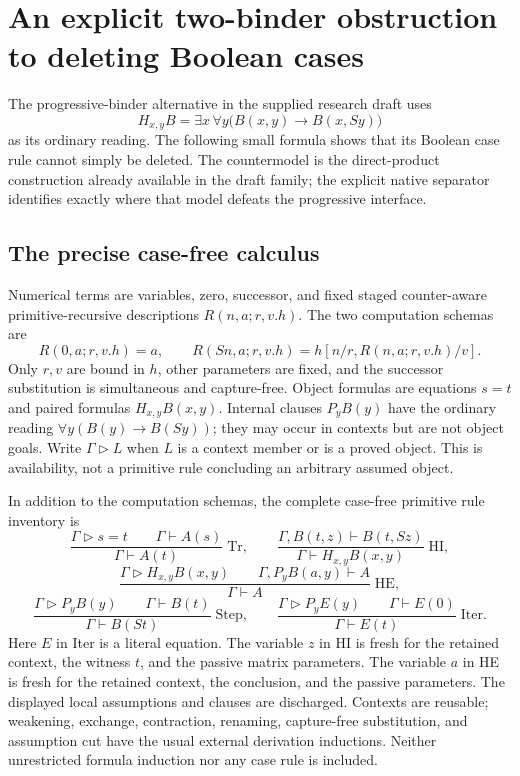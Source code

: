 \section{An explicit two-binder obstruction to deleting Boolean cases}
\label{sec:two-binder-obstruction}

The progressive-binder alternative in the supplied research draft uses
\[
 H_{x,y}B=\exists x\,\forall y\bigl(B(x,y)\to B(x,Sy)\bigr)
\]
as its ordinary reading. The following small formula shows that its
Boolean case rule cannot simply be deleted. The countermodel is the
direct-product construction already available in the draft family;
the explicit native separator identifies exactly where that model defeats
the progressive interface.

\subsection{The precise case-free calculus}

Numerical terms are variables, zero, successor, and fixed staged
counter-aware primitive-recursive descriptions
$R(n,a;r,v.h)$. The two computation schemas are
\[
 R(0,a;r,v.h)=a,\qquad
 R(Sn,a;r,v.h)=h[n/r,R(n,a;r,v.h)/v].
\]
Only $r,v$ are bound in $h$, other parameters are fixed, and the
successor substitution is simultaneous and capture-free. Object formulas
are equations $s=t$ and paired formulas $H_{x,y}B(x,y)$. Internal
clauses $P_yB(y)$ have the ordinary reading
$\forall y(B(y)\to B(Sy))$; they may occur in contexts but are not
object goals. Write $\Gamma\mathrel{\triangleright}L$ when $L$ is a
context member or is a proved object. This is availability, not a
primitive rule concluding an arbitrary assumed object.

In addition to the computation schemas, the complete case-free primitive
rule inventory is
\[
 \frac{\Gamma\mathrel{\triangleright}s=t\qquad
       \Gamma\vdash A(s)}{\Gamma\vdash A(t)}\;\mathrm{Tr},
 \qquad
 \frac{\Gamma,B(t,z)\vdash B(t,Sz)}
      {\Gamma\vdash H_{x,y}B(x,y)}\;\mathrm{HI},
\]
\[
 \frac{\Gamma\mathrel{\triangleright}H_{x,y}B(x,y)\qquad
       \Gamma,P_yB(a,y)\vdash A}{\Gamma\vdash A}\;\mathrm{HE},
\]
\[
 \frac{\Gamma\mathrel{\triangleright}P_yB(y)\qquad
       \Gamma\vdash B(t)}{\Gamma\vdash B(St)}\;\mathrm{Step},
 \qquad
 \frac{\Gamma\mathrel{\triangleright}P_yE(y)\qquad
       \Gamma\vdash E(0)}{\Gamma\vdash E(t)}\;\mathrm{Iter}.
\]
Here $E$ in Iter is a literal equation. The variable $z$ in HI is
fresh for the retained context, the witness $t$, and the passive matrix
parameters. The variable $a$ in HE is fresh for the retained context,
the conclusion, and the passive parameters. The displayed local
assumptions and clauses are discharged. Contexts are reusable; weakening,
exchange, contraction, renaming, capture-free substitution, and assumption
cut have the usual external derivation inductions. Neither unrestricted
formula induction nor any case rule is included.

